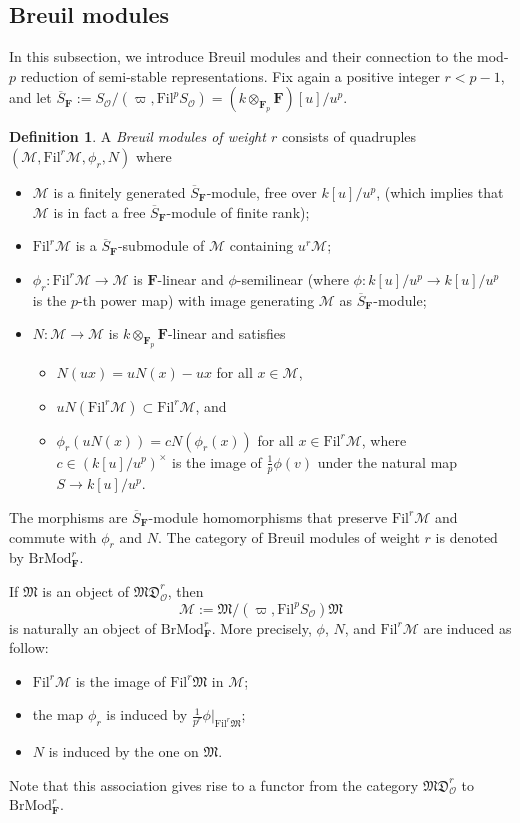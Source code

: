 \documentclass[11pt]{amsart}
\theoremstyle{definition}
\numberwithin{equation}{subsection}
\theoremstyle{plain}
\theoremstyle{plain}
\theoremstyle{plain}
\theoremstyle{plain}
\theoremstyle{plain}
\theoremstyle{plain}
\theoremstyle{plain}
\theoremstyle{plain}
\theoremstyle{plain}
\theoremstyle{plain}
\theoremstyle{plain}
\theoremstyle{plain}
\theoremstyle{definition}
\newtheorem{defi}[equation]{Definition}
\theoremstyle{definition}
\theoremstyle{definition}
\theoremstyle{remark}
\renewcommand{\(}{\textup{(}}
\renewcommand{\)}{\textup{)}}
\newcommand{\F}{\mathbf{F}}
\newcommand{\barS}{\overline{S}}
\newcommand{\cM}{\mathcal{M}}
\newcommand{\fM}{\mathfrak{M}}
\newcommand{\Fil}{\mathrm{Fil}}
\newcommand{\cO}{\mathcal{O}}
\begin{document}
\subsection{Breuil modules}
In this subsection, we introduce Breuil modules and their connection to the mod-$p$ reduction of semi-stable representations. Fix again a positive integer $r<p-1$, and let $\barS_\F:=S_\cO/(\varpi,\Fil^pS_\cO)=(k\otimes_{\F_p}\F)[u]/u^{p}$.
\begin{defi}
A \emph{Breuil modules of weight $r$} consists of quadruples $(\cM,\Fil^r\cM,\phi_{r},N)$ where
\begin{itemize}[leftmargin=*]
\item $\cM$ is a finitely generated $\barS_\F$-module, free over $k[u]/u^{p}$, (which implies that $\cM$ is in fact a free $\barS_\F$-module of finite rank);
\item $\Fil^r\cM$ is a $\barS_\F$-submodule of $\cM$ containing $u^{r}\cM$;
\item $\phi_{r}:\Fil^r\cM\rightarrow\cM$ is $\F$-linear and $\phi$-semilinear (where $\phi:k[u]/u^{p}\rightarrow k[u]/u^{p}$ is the $p$-th power map) with image generating $\cM$ as $\barS_\F$-module;
\item $N:\cM\rightarrow\cM$ is $k\otimes_{\F_p}\F$-linear and satisfies
     \begin{itemize}[leftmargin=*]
     \item $N(ux)=uN(x)-ux$ for all $x\in\cM$,
     \item $uN(\Fil^r\cM)\subset \Fil^r\cM$, and
     \item $\phi_{r}(uN(x))=cN(\phi_{r}(x))$ for all $x\in\Fil^r\cM$, where $c\in (k[u]/u^{p})^{\times}$ is the image of $\frac{1}{p}\phi(v)$ under the natural map $S\rightarrow k[u]/u^{p}$.
     \end{itemize}
\end{itemize}
The morphisms are $\barS_\F$-module homomorphisms that preserve $\Fil^r\cM$ and commute with $\phi_{r}$ and $N$. The category of Breuil modules of weight $r$ is denoted by $\mathrm{BrMod}^{r}_{\F}$.
\end{defi}


If $\fM$ is an object of $\mathfrak{MD}^{r}_{\cO}$, then $$\cM:=\fM/(\varpi,\Fil^{p}S_\cO)\fM$$ is naturally an object of $\mathrm{BrMod}^{r}_{\F}$. More precisely,
$\phi$, $N$, and $\Fil^r\cM$ are induced as follow:
\begin{itemize}[leftmargin=*]
\item $\Fil^r\cM$ is the image of $\Fil^r\fM$ in $\cM$;
\item the map $\phi_{r}$ is induced by $\frac{1}{p^{r}}\phi|_{\Fil^r\fM}$;
\item $N$ is induced by the one on $\fM$.
\end{itemize}
Note that this association gives rise to a functor from the category $\mathfrak{MD}^{r}_{\cO}$ to $\mathrm{BrMod}^{r}_{\F}$.
\end{document}
